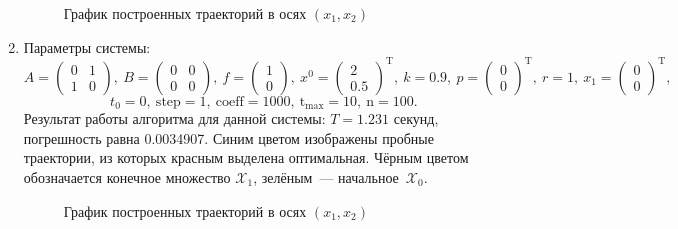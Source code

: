 \documentclass[a4paper,11pt]{article}
\begin{document}
\begin{enumerate}
\begin{figure}[H]
\caption{График построенных траекторий в осях $(x_1, x_2)$}
\end{figure}

\item Параметры системы: 
\[A = \begin{pmatrix}
  0 & 1 \\
  1 & 0
\end{pmatrix}, \ 
B = \begin{pmatrix}
  0 & 0 \\
  0 & 0
\end{pmatrix}, \ 
f = \begin{pmatrix}
  1\\
  0
\end{pmatrix}, \ 
x^0 = \begin{pmatrix}
  2\\
  0.5
\end{pmatrix}^\mathrm{T}, \ 
k = 0.9, \ 
p = \begin{pmatrix}
  0\\
  0
\end{pmatrix}^\mathrm{T}, \ 
r = 1, \ 
x_1 = \begin{pmatrix}
  0\\
  0
\end{pmatrix}^\mathrm{T},\]
\[ t_0 = 0, \  \mathrm{step} = 1, \ \mathrm{coeff} = 1000, \ \mathrm{t_{max}} = 10, \ \mathrm{n} = 100.\] 
Результат работы алгоритма для данной системы: $T = 1.231$ секунд, погрешность равна 0.0034907. Синим цветом изображены пробные траектории, из которых красным выделена оптимальная. Чёрным цветом обозначается конечное множество $\mathcal{X}_1$, зелёным~--- начальное~$\mathcal{X}_0$.
\begin{figure}[H]
\caption{График построенных траекторий в осях $(x_1, x_2)$}
\end{figure}


\end{enumerate}
\end{document}
